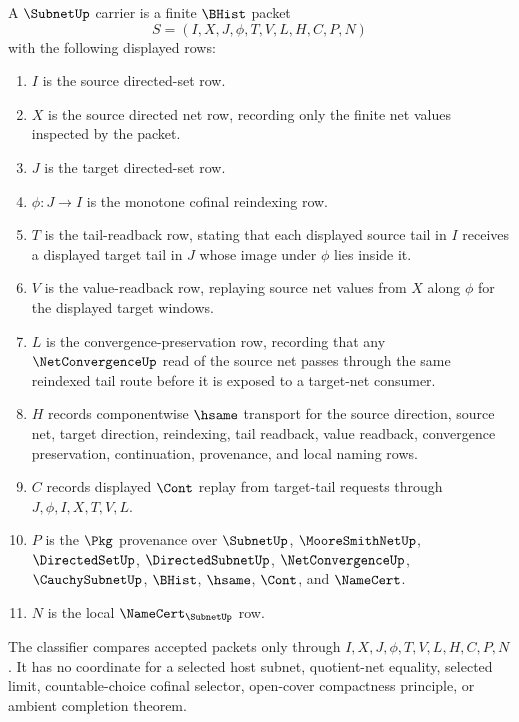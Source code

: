 \begin{definition}
\label{def:subnet-carrier}
A $\SubnetUp$ carrier is a finite $\BHist$ packet
$$
S=(I,X,J,\phi,T,V,L,H,C,P,N)
$$
with the following displayed rows:
\begin{enumerate}
\item $I$ is the source directed-set row.
\item $X$ is the source directed net row, recording only the finite net values inspected by the packet.
\item $J$ is the target directed-set row.
\item $\phi:J\to I$ is the monotone cofinal reindexing row.
\item $T$ is the tail-readback row, stating that each displayed source tail in $I$ receives a displayed target tail in $J$ whose image under $\phi$ lies inside it.
\item $V$ is the value-readback row, replaying source net values from $X$ along $\phi$ for the displayed target windows.
\item $L$ is the convergence-preservation row, recording that any $\NetConvergenceUp$ read of the source net passes through the same reindexed tail route before it is exposed to a target-net consumer.
\item $H$ records componentwise $\hsame$ transport for the source direction, source net, target direction, reindexing, tail readback, value readback, convergence preservation, continuation, provenance, and local naming rows.
\item $C$ records displayed $\Cont$ replay from target-tail requests through $J,\phi,I,X,T,V,L$.
\item $P$ is the $\Pkg$ provenance over $\SubnetUp$, $\MooreSmithNetUp$, $\DirectedSetUp$, $\DirectedSubnetUp$, $\NetConvergenceUp$, $\CauchySubnetUp$, $\BHist$, $\hsame$, $\Cont$, and $\NameCert$.
\item $N$ is the local $\NameCert_{\SubnetUp}$ row.
\end{enumerate}
The classifier compares accepted packets only through $I,X,J,\phi,T,V,L,H,C,P,N$. It has no coordinate for a selected host subnet, quotient-net equality, selected limit, countable-choice cofinal selector, open-cover compactness principle, or ambient completion theorem.
\end{definition}

